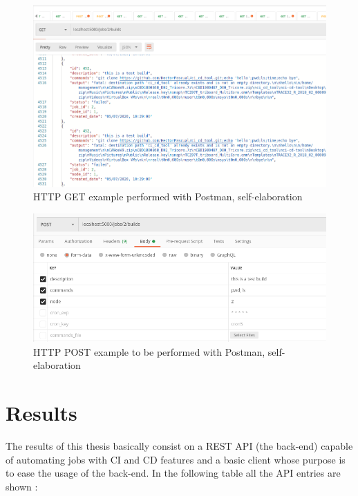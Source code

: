 \documentclass{article}
\begin{document}
\begin{figure}[H]
    \centering
    \includegraphics[scale=0.4]{postman_example1}
    \caption{HTTP GET example performed with Postman, self-elaboration}
\end{figure}

\begin{figure}[H]
    \centering
    \includegraphics[scale=0.4]{postman_example2}
    \caption{HTTP POST example to be performed with Postman, self-elaboration}
\end{figure}

\newpage
\section{Results}

The results of this thesis basically consist on a REST API (the back-end) capable of automating jobs with CI and CD features and a basic client whose purpose is to ease the usage of the back-end. In the following table all the API entries are shown :
\end{document}
